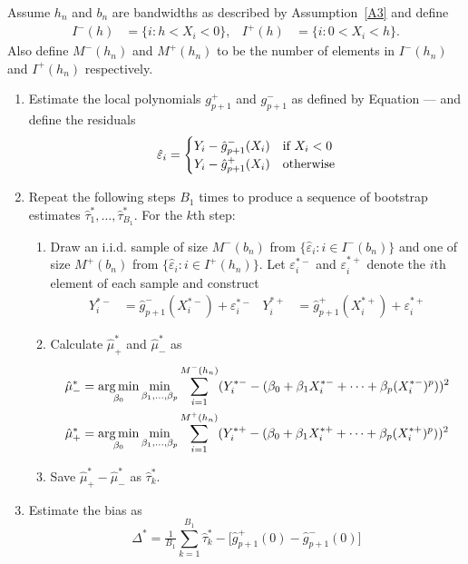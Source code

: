 \documentclass[12pt,fleqn]{article}
\begin{document}
\begin{algorithm}\label{Alg1}
  Assume $h_n$ and $b_n$ are bandwidths as described by Assumption~\ref{A3} and
  define
  \begin{align}
    I^-(h) &= \{i : h < X_i < 0\}, &
    I^+(h) &= \{i : 0 < X_i < h\}.
  \end{align}
  Also define $M^-(h_n)$ and $M^+(h_n)$ to be the number of elements in
  $I^-(h_n)$ and $I^+(h_n)$ respectively.
  \begin{enumerate}
  \item Estimate the local polynomials $g_{p+1}^+$ and $g_{p+1}^-$ as defined by
    Equation --- and define the residuals
    \begin{equation}
      \label{eq:1}
      \hat\varepsilon_i =
      \begin{cases}
        Y_i - \hat g_{p+1}^-(X_i) & \text{if}\ X_i < 0 \\
        Y_i - \hat g_{p+1}^+(X_i) & \text{otherwise}
      \end{cases}
    \end{equation}
  \item Repeat the following steps $B_1$ times to produce a sequence of bootstrap
    estimates $\hat\tau_1^*,\dots,\hat\tau_{B_1}^*$. For the $k$th step:
    \begin{enumerate}
    \item Draw an i.i.d. sample of size $M^-(b_n)$ from
      $\{\hat\varepsilon_i : i \in I^-(b_n)\}$ and one of size $M^+(b_n)$ from
      $\{\hat\varepsilon_i : i \in I^+(h_n)\}$. Let $\varepsilon_i^{*-}$ and
      $\varepsilon_i^{*+}$ denote the $i$th element of each sample and construct
      \begin{align}
        \label{eq:2}
        Y_i^{*-} &= \hat g_{p+1}^-(X_i^{*-}) + \varepsilon_i^{*-} &
        Y_i^{*+} &= \hat g_{p+1}^+(X_i^{*+}) + \varepsilon_i^{*+}
      \end{align}
    \item Calculate $\hat\mu_+^*$ and $\hat\mu_-^*$ as
      \begin{align}
        \hat\mu_-^*
        &= \operatorname*{arg\,min}_{\beta_0} \min_{\beta_1,\dots,\beta_p}
          \sum_{i = 1}^{M^-(h_n)} (Y_i^{*-} -
          (\beta_0 + \beta_1 X_i^{*-} + \cdots + \beta_p (X_i^{*-})^p))^2 \\
        \hat\mu_+^*
        &= \operatorname*{arg\,min}_{\beta_0} \min_{\beta_1,\dots,\beta_p}
          \sum_{i = 1}^{M^+(h_n)} (Y_i^{*+} -
          (\beta_0 + \beta_1 X_i^{*+} + \cdots + \beta_p (X_i^{*+})^p))^2
      \end{align}
    \item Save $\hat\mu_+^* - \hat\mu_-^*$ as $\hat\tau^*_k$.
    \end{enumerate}
  \item Estimate the bias as
    \begin{equation}
      \label{eq:4}
      \Delta^* = \tfrac{1}{B_1} \sum_{k=1}^{B_1} \hat\tau^*_k -
      \big[\hat g_{p+1}^+(0) - \hat g_{p+1}^-(0)\big]
    \end{equation}
  \end{enumerate}
\end{algorithm}
\end{document}
